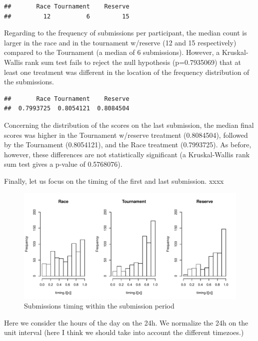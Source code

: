 \documentclass[12pt,]{article}
\theoremstyle{plain} %
\begin{document}
\begin{verbatim}
##       Race Tournament    Reserve 
##         12          6         15
\end{verbatim}

Regarding to the frequency of submissions per participant, the median
count is larger in the race and in the tournament w/reserve (12 and 15
respectively) compared to the Tournament (a median of 6 submissions).
However, a Kruskal-Wallis rank sum test fails to reject the null
hypothesis (p=0.7935069) that at least one treatment was different in
the location of the frequency distribution of the submissions.

\begin{verbatim}
##       Race Tournament    Reserve 
##  0.7993725  0.8054121  0.8084504
\end{verbatim}

Concerning the distribution of the scores on the last submission, the
median final scores was higher in the Tournament w/reserve treatment
(0.8084504), followed by the Tournament (0.8054121), and the Race
treatment (0.7993725). As before, however, these differences are not
statistically significant (a Kruskal-Wallis rank sum test gives a
p-value of 0.5768076).

Finally, let us focus on the timing of the first and last submission.
xxxx

\begin{figure}
\centering
\includegraphics{Figures/unnamed-chunk-15-1.pdf}
\caption{Submissions timing within the submission period}
\end{figure}

Here we consider the hours of the day on the 24h. We normalize the 24h
on the unit interval (here I think we should take into account the
different timezoes.)
\end{document}
